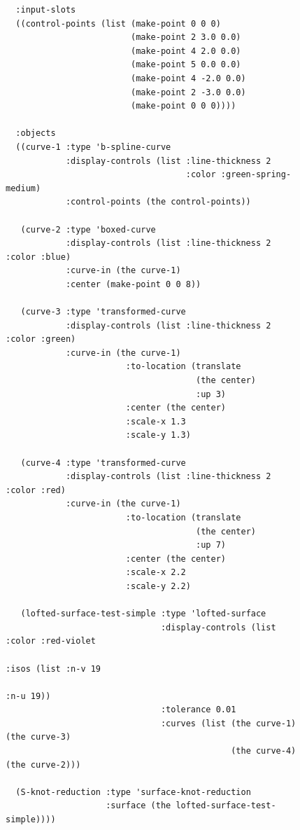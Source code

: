 \documentclass [11pt]{book}
\begin{document}
\begin{itemize}
\begin{figure}
\begin{lrbox}{\boxedverb}
\begin{minipage}{\linewidth}
{\begin{verbatim}
  :input-slots
  ((control-points (list (make-point 0 0 0)
                         (make-point 2 3.0 0.0) 
                         (make-point 4 2.0 0.0) 
                         (make-point 5 0.0 0.0) 
                         (make-point 4 -2.0 0.0) 
                         (make-point 2 -3.0 0.0) 
                         (make-point 0 0 0))))

  :objects
  ((curve-1 :type 'b-spline-curve
            :display-controls (list :line-thickness 2 
                                    :color :green-spring-medium)
            :control-points (the control-points))

   (curve-2 :type 'boxed-curve 
            :display-controls (list :line-thickness 2 :color :blue)
            :curve-in (the curve-1)
            :center (make-point 0 0 8))

   (curve-3 :type 'transformed-curve
            :display-controls (list :line-thickness 2 :color :green)
            :curve-in (the curve-1)
                        :to-location (translate 
                                      (the center) 
                                      :up 3)
                        :center (the center)
                        :scale-x 1.3
                        :scale-y 1.3)
   
   (curve-4 :type 'transformed-curve
            :display-controls (list :line-thickness 2 :color :red)
            :curve-in (the curve-1)
                        :to-location (translate 
                                      (the center) 
                                      :up 7)
                        :center (the center)
                        :scale-x 2.2
                        :scale-y 2.2)
  
   (lofted-surface-test-simple :type 'lofted-surface
                               :display-controls (list :color :red-violet 
                                                       :isos (list :n-v 19 
                                                                   :n-u 19))
                               :tolerance 0.01
                               :curves (list (the curve-1) (the curve-3)
                                             (the curve-4) (the curve-2)))  

  (S-knot-reduction :type 'surface-knot-reduction
                    :surface (the lofted-surface-test-simple))))


 
\end{verbatim}}
\end{minipage}
\end{lrbox}
\fbox{\usebox{\boxedverb}}


\end{figure}
\end{itemize}
\end{document}
